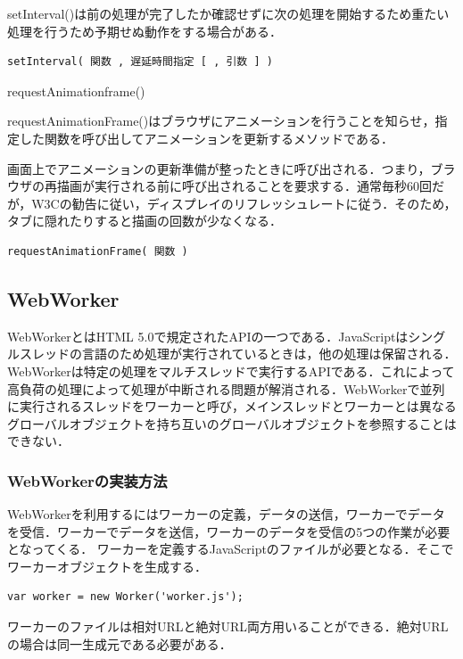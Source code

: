 \documentclass[a4j,12pt]{jsarticle}
\begin{document}
setInterval()は前の処理が完了したか確認せずに次の処理を開始するため重たい処理を行うため予期せぬ動作をする場合がある．
\begin{lstlisting}[frame=single]
setInterval( 関数 , 遅延時間指定 [ , 引数 ] )
 \end{lstlisting}


\begin{Large}
requestAnimationframe()
\end{Large}

requestAnimationFrame()はブラウザにアニメーションを行うことを知らせ，指定した関数を呼び出してアニメーションを更新するメソッドである．

画面上でアニメーションの更新準備が整ったときに呼び出される．つまり，ブラウザの再描画が実行される前に呼び出されることを要求する．通常毎秒60回だが，W3Cの勧告に従い，ディスプレイのリフレッシュレートに従う．そのため，タブに隠れたりすると描画の回数が少なくなる．

\begin{lstlisting}[frame=single]
requestAnimationFrame( 関数 )
 \end{lstlisting}
 
\subsection{WebWorker}
WebWorkerとはHTML 5.0で規定されたAPIの一つである．JavaScriptはシングルスレッドの言語のため処理が実行されているときは，他の処理は保留される．WebWorkerは特定の処理をマルチスレッドで実行するAPIである．これによって高負荷の処理によって処理が中断される問題が解消される．WebWorkerで並列に実行されるスレッドをワーカーと呼び，メインスレッドとワーカーとは異なるグローバルオブジェクトを持ち互いのグローバルオブジェクトを参照することはできない．

\subsubsection{WebWorkerの実装方法}
WebWorkerを利用するにはワーカーの定義，データの送信，ワーカーでデータを受信．ワーカーでデータを送信，ワーカーのデータを受信の5つの作業が必要となってくる．
ワーカーを定義するJavaScriptのファイルが必要となる．そこでワーカーオブジェクトを生成する．
\begin{lstlisting}[basicstyle=\ttfamily\footnotesize, frame=single]
var worker = new Worker('worker.js');
 \end{lstlisting}
ワーカーのファイルは相対URLと絶対URL両方用いることができる．絶対URLの場合は同一生成元である必要がある．
\end{document}

